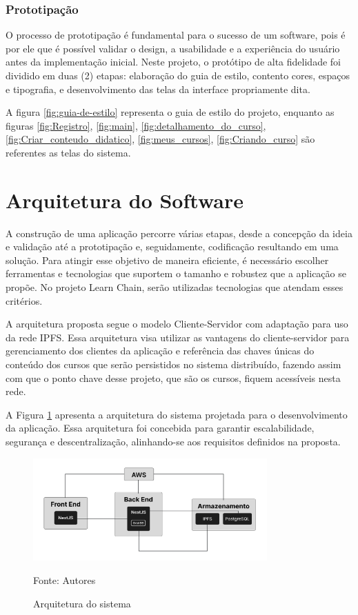         \subsubsection{Prototipação}

        O processo de prototipação é fundamental para o sucesso de um software, pois é por ele que é possível validar o design, a usabilidade e a experiência do usuário antes da implementação inicial. Neste projeto, o protótipo de alta fidelidade foi dividido em duas (2) etapas: elaboração do guia de estilo, contento cores, espaços e tipografia, e desenvolvimento das telas da interface propriamente dita. 

        A figura \ref{fig:guia-de-estilo} representa o guia de estilo do projeto, enquanto as figuras \ref{fig:Registro}, \ref{fig:main}, \ref{fig:detalhamento_do_curso}, \ref{fig:Criar_conteudo_didatico}, \ref{fig:meus_cursos}, \ref{fig:Criando_curso} são referentes as telas do sistema.

\section{Arquitetura do Software}
A construção de uma aplicação percorre várias etapas, desde a concepção da ideia e validação até a prototipação e, seguidamente, codificação resultando em uma solução. Para atingir esse objetivo de maneira eficiente, é necessário escolher ferramentas e tecnologias que suportem  o tamanho e robustez que a aplicação se propõe. No projeto Learn Chain, serão utilizadas tecnologias que atendam esses critérios.

A arquitetura proposta segue o modelo Cliente-Servidor com adaptação para uso da rede IPFS. Essa arquitetura visa utilizar as vantagens do cliente-servidor para gerenciamento dos clientes da aplicação e referência das chaves únicas do conteúdo dos cursos que serão persistidos no sistema distribuído, fazendo assim com que o ponto chave desse projeto, que são os cursos, fiquem acessíveis nesta rede.

A Figura \ref{fig:arquitetura_sistema} apresenta a arquitetura do sistema projetada para o desenvolvimento da aplicação. Essa arquitetura foi concebida para garantir escalabilidade, segurança e descentralização, alinhando-se aos requisitos definidos na proposta.

\begin{figure}[h]
    \centering
    \caption{Arquitetura do sistema}
    \includegraphics[width=0.8\textwidth]{figuras/arquitetura.png}
    \begin{center}
        {\footnotesize Fonte: Autores}
    \end{center}
    \label{fig:arquitetura_sistema}
\end{figure}

